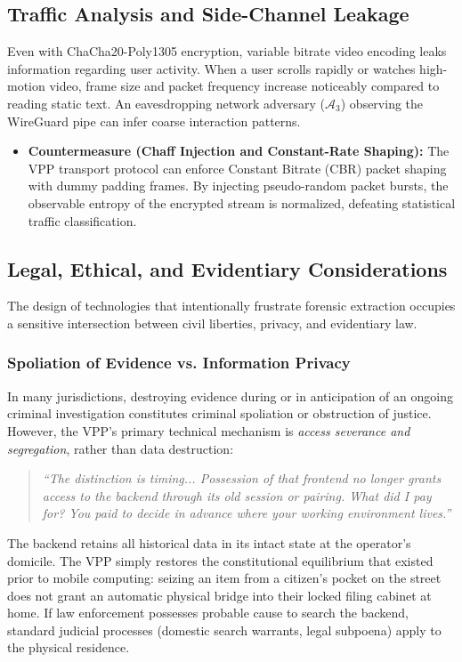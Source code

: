 \subsection{Traffic Analysis and Side-Channel Leakage}
Even with ChaCha20-Poly1305 encryption, variable bitrate video encoding leaks information regarding user activity. When a user scrolls rapidly or watches high-motion video, frame size and packet frequency increase noticeably compared to reading static text. An eavesdropping network adversary ($\mathcal{A}_3$) observing the WireGuard pipe can infer coarse interaction patterns.
\begin{itemize}
    \item \textbf{Countermeasure (Chaff Injection and Constant-Rate Shaping):} The VPP transport protocol can enforce Constant Bitrate (CBR) packet shaping with dummy padding frames. By injecting pseudo-random packet bursts, the observable entropy of the encrypted stream is normalized, defeating statistical traffic classification.
\end{itemize}

\subsection{Legal, Ethical, and Evidentiary Considerations}
The design of technologies that intentionally frustrate forensic extraction occupies a sensitive intersection between civil liberties, privacy, and evidentiary law.

\subsubsection{Spoliation of Evidence vs. Information Privacy}
In many jurisdictions, destroying evidence during or in anticipation of an ongoing criminal investigation constitutes criminal spoliation or obstruction of justice. However, the VPP's primary technical mechanism is \textit{access severance and segregation}, rather than data destruction:
\begin{quote}
\textit{“The distinction is timing... Possession of that frontend no longer grants access to the backend through its old session or pairing. What did I pay for? You paid to decide in advance where your working environment lives.”}
\end{quote}
The backend retains all historical data in its intact state at the operator's domicile. The VPP simply restores the constitutional equilibrium that existed prior to mobile computing: seizing an item from a citizen's pocket on the street does not grant an automatic physical bridge into their locked filing cabinet at home. If law enforcement possesses probable cause to search the backend, standard judicial processes (domestic search warrants, legal subpoena) apply to the physical residence.
